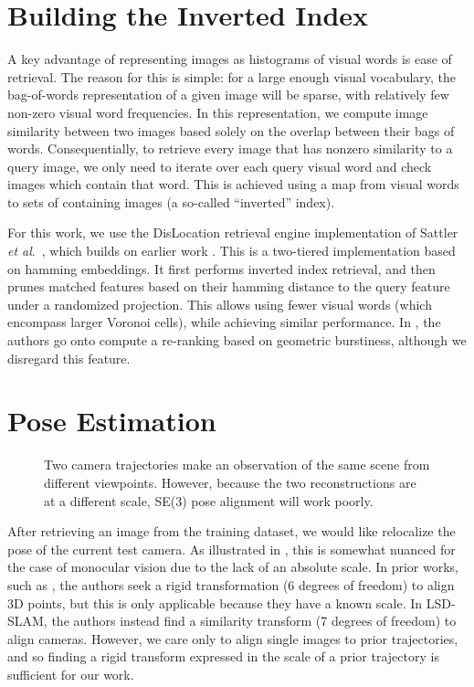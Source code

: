 \section{Building the Inverted Index}

A key advantage of representing images as histograms of visual words is ease of retrieval. The reason for this is simple: for a large enough visual vocabulary, the bag-of-words representation of a given image will be sparse, with relatively few non-zero visual word frequencies. In this representation, we compute image similarity between two images based solely on the overlap between their bags of words. Consequentially, to retrieve every image that has nonzero similarity to a query image, we only need to iterate over each query visual word and check images which contain that word. This is achieved using a map from visual words to sets of containing images (a so-called ``inverted'' index).

For this work, we use the DisLocation retrieval engine implementation of Sattler \textit{et al}.\ \cite{Sattler16CVPR}, which builds on earlier work \cite{Arandjelovic14a}. This is a two-tiered implementation based on hamming embeddings. It first performs inverted index retrieval, and then prunes matched features based on their hamming distance to the query feature under a randomized projection. This allows using fewer visual words (which encompass larger Voronoi cells), while achieving similar performance. In \cite{Sattler16CVPR}, the authors go onto compute a re-ranking based on geometric burstiness, although we disregard this feature.

\section{Pose Estimation}

\begin{figure}[h]
	\centering
	\def\svgwidth{0.8\columnwidth}
	
	\caption{Two camera trajectories make an observation of the same scene from different viewpoints. However, because the two reconstructions are at a different scale, SE(3) pose alignment will work poorly.}
	\label{fig:scale_ambiguity}
\end{figure}

After retrieving an image from the training dataset, we would like relocalize the pose of the current test camera. As illustrated in , this is somewhat nuanced for the case of monocular vision due to the lack of an absolute scale. In prior works, such as \cite{shotton2013scene}, the authors seek a rigid transformation (6 degrees of freedom) to align 3D points, but this is only applicable because they have a known scale. In LSD-SLAM, the authors instead find a similarity transform (7 degrees of freedom) to align cameras. However, we care only to align single images to prior trajectories, and so finding a rigid transform expressed in the scale of a prior trajectory is sufficient for our work.


